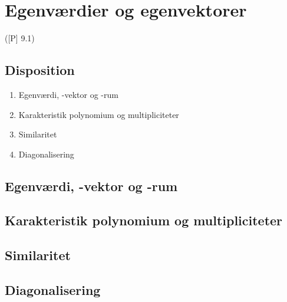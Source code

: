 \newpage
\chapter{Egenværdier og egenvektorer}
([P] 9.1)

\section*{Disposition}

\begin{enumerate}
	\item Egenværdi, -vektor og -rum
	\item Karakteristik polynomium og multipliciteter
	\item Similaritet
	\item Diagonalisering
\end{enumerate}

\section{Egenværdi, -vektor og -rum}


\section{Karakteristik polynomium og multipliciteter}



\section{Similaritet}



\section{Diagonalisering}



